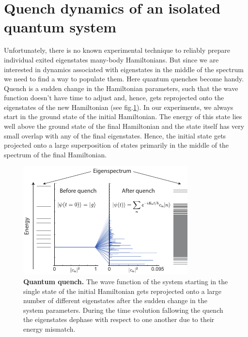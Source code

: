 \section{Quench dynamics of an isolated quantum system}

Unfortunately, there is no known experimental technique to reliably prepare individual exited eigenstates many-body Hamiltonians. But since we are interested in dynamics associated with eigenstates in the middle of the spectrum we need to find a way to populate them. Here quantum quenches become handy. Quench is a sudden change in the Hamiltonian parameters, such that the wave function doesn't have time to adjust and, hence, gets reprojected onto the eigenstates of the new Hamiltonian (see fig.\ref{fig:ETH_quench}). In our experiments, we always start in the ground state of the initial Hamiltonian. The energy of this state lies well above the ground state of the final Hamiltonian and the state itself has very small overlap with any of the final eigenstates. Hence, the initial state gets projected onto a large superposition of states primarily in the middle of the spectrum of the final Hamiltonian. 

\begin{figure}[t!]
	\centering
	\includegraphics[scale=1.5]{figures/ETH_quench.pdf}
	\caption{{\bf Quantum quench.} The wave function of the system starting in the single state of the initial Hamiltonian gets reprojected onto a large number of different eigenstates after the sudden change in the system parameters. During the time evolution fallowing the quench the eigenstates dephase with respect to one another due to their energy mismatch. }
	\label{fig:ETH_quench}
\end{figure}

